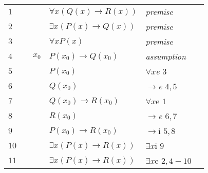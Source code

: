 \documentclass[12pt]{article}
\begin{document}
\begin{table}[H]
	
	\begin{tabular}{*6{l}}
		$1$ & & & $\forall x (Q(x) \rightarrow R(x))$ & \textit{premise} & \\ 
		$2$ & & & $\exists x (P(x) \rightarrow Q(x))$ & \textit{premise} & \\ 
		$3$ & & & $\forall x P(x)$ & \textit{premise} & \\ \cline{2-6}
		$4$ &\multicolumn{1}{|c}{} & $x_0$ & $P(x_0) \rightarrow Q(x_0)$ &\textit{assumption} &\multicolumn{1}{c|}{}\\ 
		$5$ &\multicolumn{1}{|c}{} & & $P(x_0)$ &\textit{$\forall x$e $ 3$} &\multicolumn{1}{c|}{}\\ 
		$6$ &\multicolumn{1}{|c}{} & & $Q(x_0)$ &\textit{$\rightarrow$e $ 4,5$} &\multicolumn{1}{c|}{}\\ 
		$7$ &\multicolumn{1}{|c}{} &  & $Q(x_0) \rightarrow R(x_0)$ &$\forall x$e $1$ &\multicolumn{1}{c|}{}\\ 
		$8$ &\multicolumn{1}{|c}{} & & $R(x_0)$ &\textit{$\rightarrow$e $ 6,7$} &\multicolumn{1}{c|}{}\\
		$9$ &\multicolumn{1}{|c}{} &  & $P(x_0) \rightarrow R(x_0)$ &$\rightarrow $i $5,8$ &\multicolumn{1}{c|}{}\\ 
		$10$ &\multicolumn{1}{|c}{} & & $\exists x (P(x) \rightarrow R(x))$ & $\exists x$i $9$ & \multicolumn{1}{c|}{}\\ \cline{2-6}
		$11$ & & & $\exists x (P(x) \rightarrow R(x))$ & $\exists x$e $2,4-10$ & \\
		
	\end{tabular}
\end{table}
\end{document}
